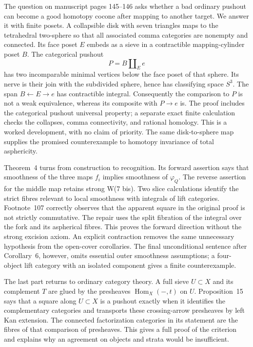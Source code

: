 The question on manuscript pages 145--146 asks whether a bad ordinary pushout can become a good homotopy cocone after mapping to another target. We answer it with finite posets. A collapsible disk with seven triangles maps to the tetrahedral two-sphere so that all associated comma categories are nonempty and connected. Its face poset $E$ embeds as a sieve in a contractible mapping-cylinder poset $B$. The categorical pushout
\[
                         P=B\amalg_E e
\]
has two incomparable minimal vertices below the face poset of that sphere. Its nerve is their join with the subdivided sphere, hence has classifying space $S^3$. The span $B\leftarrow E\to e$ has contractible integral. Consequently the comparison to $P$ is not a weak equivalence, whereas its composite with $P\to e$ is. The proof includes the categorical pushout universal property; a separate exact finite calculation checks the collapses, comma connectivity, and rational homology. This is a worked development, with no claim of priority. The same disk-to-sphere map supplies the promised counterexample to homotopy invariance of total asphericity.

Theorem~4 turns from construction to recognition. Its forward assertion says that smoothness of the three maps $f_i$ implies smoothness of $\varphi_Q$. The reverse assertion for the middle map retains strong W(7 bis). Two slice calculations identify the strict fibres relevant to local smoothness with integrals of lift categories. Footnote~107 correctly observes that the apparent square in the original proof is not strictly commutative. The repair uses the split fibration of the integral over the fork and its aspherical fibres. This proves the forward direction without the strong excision axiom. An explicit contraction removes the same unnecessary hypothesis from the open-cover corollaries. The final unconditional sentence after Corollary~6, however, omits essential outer smoothness assumptions; a four-object lift category with an isolated component gives a finite counterexample.

The last part returns to ordinary category theory. A full sieve $U\subset X$ and its complement $T$ are glued by the presheaves $\operatorname{Hom}_X(-,t)$ on $U$. Proposition~15 says that a square along $U\subset X$ is a pushout exactly when it identifies the complementary categories and transports these crossing-arrow presheaves by left Kan extension. The connected factorization categories in its statement are the fibres of that comparison of presheaves. This gives a full proof of the criterion and explains why an agreement on objects and strata would be insufficient.

